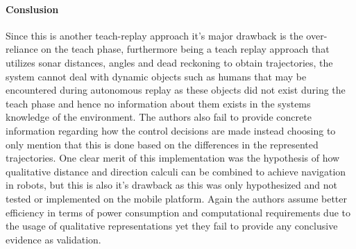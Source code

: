 \begin{itemize}
	\paragraph{Conslusion}Since this is another teach-replay approach it's major drawback is the over-reliance on the teach phase, furthermore being a teach replay approach that utilizes sonar distances, angles and dead reckoning to obtain trajectories, the system cannot deal with dynamic objects such as humans that may be encountered during autonomous replay as these objects did not exist during the teach phase and hence no information about them exists in the systems knowledge of the environment. The authors also fail to provide concrete information regarding how the control decisions are made instead choosing to only mention that this is done based on the differences in the represented trajectories. One clear merit of this implementation was the hypothesis of how qualitative distance and direction calculi can be combined to achieve navigation in robots, but this is also it's drawback as this was only hypothesized and not tested or implemented on the mobile platform. Again the authors assume better efficiency in terms of power consumption and computational requirements due to the usage of qualitative representations yet they fail to provide any conclusive evidence as validation.


\end{itemize}
